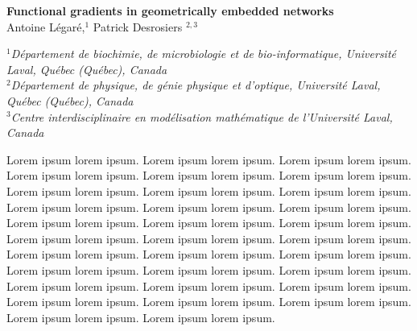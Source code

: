 \documentclass{article}
\begin{document}
\begin{center}

    {\Large \textbf{Functional gradients in geometrically embedded networks}}\\
    
    \vspace{10 pt}
    Antoine Légaré,$^{1}$ Patrick Desrosiers $^{2, 3}$ \\
    \vspace{5 pt}
    
    $^1$\textit{Département de biochimie, de microbiologie et de bio-informatique, Université Laval, Québec (Québec), Canada}\\
    $^2$\textit{Département de physique, de génie physique et d'optique, Université Laval, Québec (Québec), Canada}\\
    $^3$\textit{Centre interdisciplinaire en modélisation mathématique de l’Université Laval, Canada}
    

\end{center}

\vspace{4 pt}

Lorem ipsum lorem ipsum. Lorem ipsum lorem ipsum. Lorem ipsum lorem ipsum. Lorem ipsum lorem ipsum. Lorem ipsum lorem ipsum. Lorem ipsum lorem ipsum. Lorem ipsum lorem ipsum. Lorem ipsum lorem ipsum. Lorem ipsum lorem ipsum. Lorem ipsum lorem ipsum. Lorem ipsum lorem ipsum. Lorem ipsum lorem ipsum. Lorem ipsum lorem ipsum. Lorem ipsum lorem ipsum. Lorem ipsum lorem ipsum. Lorem ipsum lorem ipsum. Lorem ipsum lorem ipsum. Lorem ipsum lorem ipsum. Lorem ipsum lorem ipsum. Lorem ipsum lorem ipsum. Lorem ipsum lorem ipsum. Lorem ipsum lorem ipsum. Lorem ipsum lorem ipsum. Lorem ipsum lorem ipsum. Lorem ipsum lorem ipsum. Lorem ipsum lorem ipsum. Lorem ipsum lorem ipsum. Lorem ipsum lorem ipsum. Lorem ipsum lorem ipsum. Lorem ipsum lorem ipsum. Lorem ipsum lorem ipsum. Lorem ipsum lorem ipsum.

\vspace{10 pt}
\end{document}
